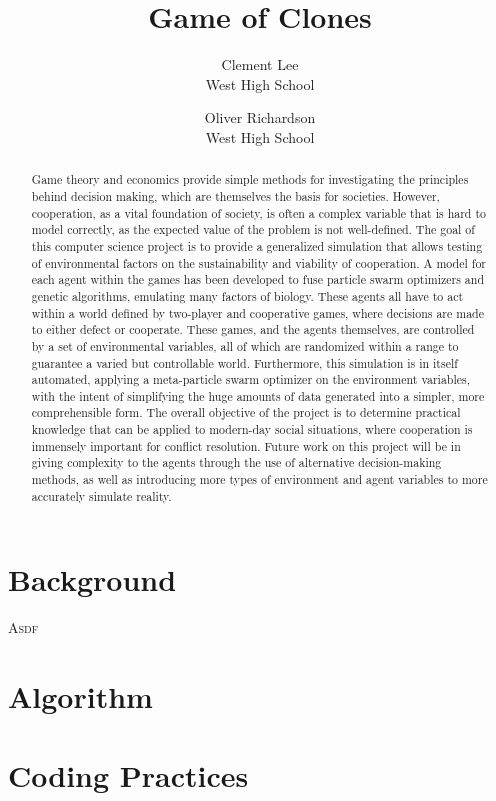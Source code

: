 \documentclass{article}
\begin{document}
\title{\Huge{Game of Clones}}
\author{Clement Lee\\
West High School\and
Oliver Richardson\\
West High School}
\maketitle

\begin{abstract}
Game theory and economics provide simple methods for investigating the principles behind decision making, which are themselves the basis for societies. However, cooperation, as a vital foundation of society, is often a complex variable that is hard to model correctly, as the expected value of the problem is not well-defined. The goal of this computer science project is to provide a generalized simulation that allows testing of environmental factors on the sustainability and viability of cooperation. A model for each agent within the games has been developed to fuse particle swarm optimizers and genetic algorithms, emulating many factors of biology. These agents all have to act within a world defined by two-player and cooperative games, where decisions are made to either defect or cooperate. These games, and the agents themselves, are controlled by a set of environmental variables, all of which are randomized within a range to guarantee a varied but controllable world. Furthermore, this simulation is in itself automated, applying a meta-particle swarm optimizer on the environment variables, with the intent of simplifying the huge amounts of data generated into a simpler, more comprehensible form. The overall objective of the project is to determine practical knowledge that can be applied to modern-day social situations, where cooperation is immensely important for conflict resolution. Future work on this project will be in giving complexity to the agents through the use of alternative decision-making methods, as well as introducing more types of environment and agent variables to more accurately simulate reality.
\end{abstract}

\section*{Background\dotfill}
\lettrine{A}{sdf} 
\lipsum
\section*{Algorithm}
\section*{Coding Practices}
\end{document}

